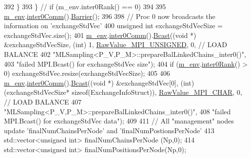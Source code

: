 \begin{DoxyCode}
392     \}
393   \} \textcolor{comment}{// if (m\_env.inter0Rank() == 0)}
394 
395   \hyperlink{class_q_u_e_s_o_1_1_m_l_sampling_a13f1ca4fe9f94822fe572a743eaced1d}{m\_env}.\hyperlink{class_q_u_e_s_o_1_1_base_environment_a689e4d140c74d495d97eb498714a4b82}{inter0Comm}().\hyperlink{class_q_u_e_s_o_1_1_mpi_comm_a4059971c30e023b272fccaa6aa00c426}{Barrier}();
396 
398   \textcolor{comment}{// Proc 0 now broadcasts the information on 'exchangeStdVec'}
400 \textcolor{comment}{}  \textcolor{keywordtype}{unsigned} \textcolor{keywordtype}{int} exchangeStdVecSize = exchangeStdVec.size();
401   \hyperlink{class_q_u_e_s_o_1_1_m_l_sampling_a13f1ca4fe9f94822fe572a743eaced1d}{m\_env}.\hyperlink{class_q_u_e_s_o_1_1_base_environment_a689e4d140c74d495d97eb498714a4b82}{inter0Comm}().\hyperlink{class_q_u_e_s_o_1_1_mpi_comm_abd6af8db8b0c7fd2f5b62e26477a9537}{Bcast}((\textcolor{keywordtype}{void} *) &exchangeStdVecSize, (\textcolor{keywordtype}{int}) 1, 
      \hyperlink{_mpi_comm_8h_a06cbfbc33436f6e0dc8a48ff3c49bdfc}{RawValue\_MPI\_UNSIGNED}, 0, \textcolor{comment}{// LOAD BALANCE}
402                            \textcolor{stringliteral}{"MLSampling<P\_V,P\_M>::prepareBalLinkedChains\_inter0()"},
403                            \textcolor{stringliteral}{"failed MPI.Bcast() for exchangeStdVec size"});
404   \textcolor{keywordflow}{if} (\hyperlink{class_q_u_e_s_o_1_1_m_l_sampling_a13f1ca4fe9f94822fe572a743eaced1d}{m\_env}.\hyperlink{class_q_u_e_s_o_1_1_base_environment_ae106b5bb8a80b655b88b3a26b1e7c185}{inter0Rank}() > 0) exchangeStdVec.resize(exchangeStdVecSize);
405 
406   \hyperlink{class_q_u_e_s_o_1_1_m_l_sampling_a13f1ca4fe9f94822fe572a743eaced1d}{m\_env}.\hyperlink{class_q_u_e_s_o_1_1_base_environment_a689e4d140c74d495d97eb498714a4b82}{inter0Comm}().\hyperlink{class_q_u_e_s_o_1_1_mpi_comm_abd6af8db8b0c7fd2f5b62e26477a9537}{Bcast}((\textcolor{keywordtype}{void} *) &exchangeStdVec[0], (\textcolor{keywordtype}{int}) (exchangeStdVecSize*\textcolor{keyword}{
      sizeof}(ExchangeInfoStruct)), \hyperlink{_mpi_comm_8h_ae81a57f3cac29c0f9c656182d95b8af1}{RawValue\_MPI\_CHAR}, 0, \textcolor{comment}{// LOAD BALANCE}
407                            \textcolor{stringliteral}{"MLSampling<P\_V,P\_M>::prepareBalLinkedChains\_inter0()"},
408                            \textcolor{stringliteral}{"failed MPI.Bcast() for exchangeStdVec data"});
409 
411   \textcolor{comment}{// All "management" nodes update 'finalNumChainsPerNode' and 'finalNumPostionsPerNode'}
413 \textcolor{comment}{}  std::vector<unsigned int> finalNumChainsPerNode   (Np,0);
414   std::vector<unsigned int> finalNumPositionsPerNode(Np,0);

\end{DoxyCode}
